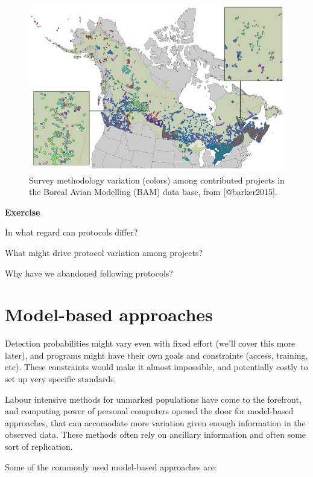 \documentclass[12pt,]{book}
\let\BeginKnitrBlock\begin \let\EndKnitrBlock\end
\begin{document}
\begin{figure}
\includegraphics[width=0.8\linewidth]{images/barker-2015-fig-2} \caption{Survey methodology variation (colors) among contributed projects in the Boreal Avian Modelling (BAM) data base, from [@barker2015].}\label{fig:intro-2}
\end{figure}

\BeginKnitrBlock{rmdexercise}
\textbf{Exercise}

In what regard can protocols differ?

What might drive protocol variation among projects?

Why have we abandoned following protocols?
\EndKnitrBlock{rmdexercise}

\hypertarget{model-based-approaches}{%
\section{Model-based approaches}\label{model-based-approaches}}

Detection probabilities might vary even with fixed effort
(we'll cover this more later),
and programs might have their own goals and constraints (access, training, etc).
These constraints would make it almost impossible, and potentially costly
to set up very specific standards.

Labour intensive methods for unmarked populations
have come to the forefront, and computing power of
personal computers opened the door for model-based approaches,
that can accomodate more variation given enough information
in the observed data. These methods often rely on ancillary
information and often some sort of replication.

Some of the commonly used model-based approaches are:
\end{document}
